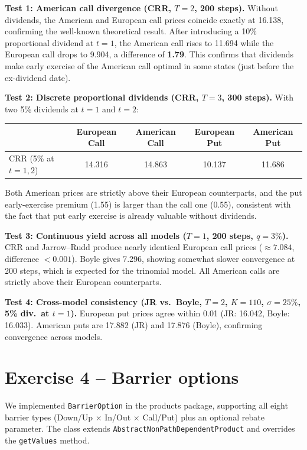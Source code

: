 \documentclass[11pt,a4paper]{article}
\begin{document}
\textbf{Test 1: American call divergence (CRR, $T=2$, 200 steps).} Without dividends, the American and European call prices coincide exactly at 16.138, confirming the well-known theoretical result. After introducing a 10\% proportional dividend at $t=1$, the American call rises to 11.694 while the European call drops to 9.904, a difference of \textbf{1.79}. This confirms that dividends make early exercise of the American call optimal in some states (just before the ex-dividend date).

\textbf{Test 2: Discrete proportional dividends (CRR, $T=3$, 300 steps).} With two 5\% dividends at $t=1$ and $t=2$:

\smallskip
\begin{tabular}{@{}lcccc@{}}
\toprule
 & European Call & American Call & European Put & American Put \\
\midrule
CRR (5\% at $t\!=\!1,2$) & 14.316 & 14.863 & 10.137 & 11.686 \\
\bottomrule
\end{tabular}
\smallskip

Both American prices are strictly above their European counterparts, and the put early-exercise premium (1.55) is larger than the call one (0.55), consistent with the fact that put early exercise is already valuable without dividends.

\textbf{Test 3: Continuous yield across all models ($T=1$, 200 steps, $q=3\%$).} CRR and Jarrow--Rudd produce nearly identical European call prices ($\approx 7.084$, difference $< 0.001$). Boyle gives 7.296, showing somewhat slower convergence at 200 steps, which is expected for the trinomial model. All American calls are strictly above their European counterparts.

\textbf{Test 4: Cross-model consistency (JR vs.\ Boyle, $T=2$, $K=110$, $\sigma=25\%$, 5\% div.\ at $t=1$).} European put prices agree within 0.01 (JR: 16.042, Boyle: 16.033). American puts are 17.882 (JR) and 17.876 (Boyle), confirming convergence across models.

\section{Exercise 4 -- Barrier options}

We implemented \texttt{BarrierOption} in the products package, supporting all eight barrier types (Down/Up $\times$ In/Out $\times$ Call/Put) plus an optional rebate parameter. The class extends \texttt{AbstractNonPathDependentProduct} and overrides the \texttt{getValues} method.
\end{document}
